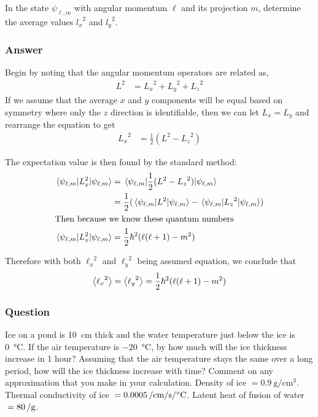 In the state $\psi_{\ell ,m}$ with angular momentum $\ell $ and its projection $m$,
determine the average values ${l_x}^2$ and ${l_y}^2$.

\subsubsection{Answer}

Begin by noting that the angular momentum operators are related as,
\begin{align*}
    L^2 &= {L_x}^2 + {L_y}^2 + {L_z}^2
\end{align*}
If we assume that the average $x$ and $y$ components will be equal based on
symmetry where only the $z$ direction is identifiable, then we can let
$L_x = L_y$ and rearrange the equation to get
\begin{align*}
    {L_x}^2 &= \frac{1}{2}(L^2 - {L_z}^2)
\end{align*}

The expectation value is then found by the standard method:
\begin{align*}
    \mel{\psi _{\ell,m}}{L_x^2}{\psi _{\ell ,m}} &= \mel{\psi _{\ell ,m}}
	{\frac{1}{2}(L^2 - {L_z}^2)}{\psi _{\ell ,m}} \\
    {} &= \frac{1}{2}(\mel{\psi _{\ell ,m}}{L^2}{\psi _{\ell ,m}} -
	\mel{\psi _{\ell ,m}}{{L_z}^2}{\psi _{\ell ,m}}) \\
\intertext{Then because we know these quantum numbers}
    \mel{\psi _{\ell ,m}}{L_x^2}{\psi _{\ell ,m}} &= \frac 12 \hbar^2(\ell(\ell+1)  - m^2)
\end{align*}

Therefore with both ${\ell _x}^2$ and ${\ell _y}^2$ being assumed equation, we conclude
that
\begin{align}
    \expval{{\ell _x}^2} = \expval{{\ell _y}^2} = \frac 12 \hbar^2(\ell(\ell+1)  - m^2)
\end{align}

\subsubsection{Question}

Ice on a pond is \SI{10}{\cm} thick and the water temperature just below the
ice is \SI{0}{\celsius}. If the air temperature is \SI{-20}{\celsius}, by
how much will the ice thickness increase in 1 hour? Assuming that the air
temperature stays the same over a long period, how will the ice thickness
increase with time? Comment on any approximation that you make in your
calculation. Density of ice ${}= \SI{0.9}{\g\per\cm\cubed}$. Thermal conductivity of ice ${}= \SI{0.0005}{\cal\per\cm\per\s\per\celsius}$. Latent heat of fusion of water ${}= \SI{80}{\cal\per\g}$.

